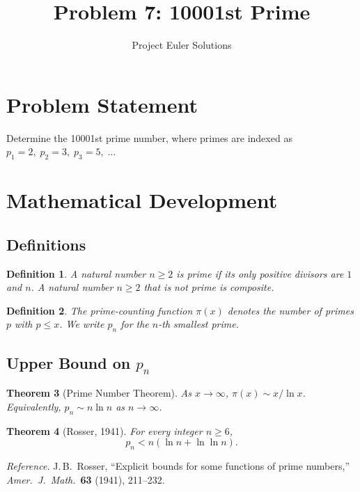 \documentclass[11pt]{article}
\title{Problem 7: 10001st Prime}
\author{Project Euler Solutions}
\date{}
\newtheorem{theorem}{Theorem}
\newtheorem{definition}[theorem]{Definition}
\begin{document}
\maketitle

\section{Problem Statement}

Determine the 10001st prime number, where primes are indexed as $p_1 = 2,\; p_2 = 3,\; p_3 = 5,\; \ldots$

\section{Mathematical Development}

\subsection{Definitions}

\begin{definition}
A natural number $n \ge 2$ is \emph{prime} if its only positive divisors are $1$ and $n$. A natural number $n \ge 2$ that is not prime is \emph{composite}.
\end{definition}

\begin{definition}
The \emph{prime-counting function} $\pi(x)$ denotes the number of primes $p$ with $p \le x$. We write $p_n$ for the $n$-th smallest prime.
\end{definition}

\subsection{Upper Bound on $p_n$}

\begin{theorem}[Prime Number Theorem]
As $x \to \infty$, $\pi(x) \sim x / \ln x$. Equivalently, $p_n \sim n \ln n$ as $n \to \infty$.
\end{theorem}

\begin{theorem}[Rosser, 1941]\label{thm:rosser}
For every integer $n \ge 6$,
\[
p_n < n(\ln n + \ln \ln n).
\]
\end{theorem}

\noindent\textit{Reference.} J.\,B.~Rosser, ``Explicit bounds for some functions of prime numbers,'' \emph{Amer.\ J.\ Math.}\ \textbf{63} (1941), 211--232.
\end{document}
